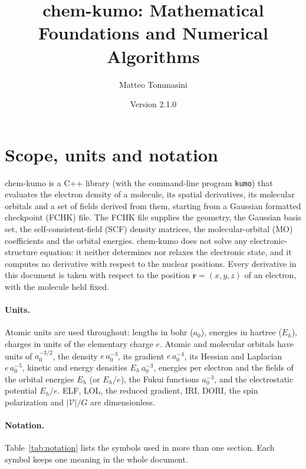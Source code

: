\documentclass[11pt,a4paper]{article}
\title{chem-kumo: Mathematical Foundations and Numerical Algorithms}
\author{Matteo Tommasini}
\date{Version 2.1.0}
\begin{document}
\maketitle
\tableofcontents

\section{Scope, units and notation}

chem-kumo is a C++ library (with the command-line program \texttt{kumo})
that evaluates the electron density of a molecule, its spatial derivatives,
its molecular orbitals and a set of fields derived from them, starting from
a Gaussian formatted checkpoint (FCHK) file. The FCHK file supplies the
geometry, the Gaussian basis set, the self-consistent-field (SCF) density
matrices, the molecular-orbital (MO) coefficients and the orbital energies.
chem-kumo does not solve any electronic-structure equation: it neither
determines nor relaxes the electronic state, and it computes no derivative
with respect to the nuclear positions. Every derivative in this document is
taken with respect to the position $\mathbf r=(x,y,z)$ of an electron, with
the molecule held fixed.

\paragraph{Units.} Atomic units are used throughout: lengths in bohr
($a_0$), energies in hartree ($E_h$), charges in units of the elementary
charge $e$. Atomic and molecular orbitals have units of $a_0^{-3/2}$, the
density $e\,a_0^{-3}$, its gradient $e\,a_0^{-4}$, its Hessian and
Laplacian $e\,a_0^{-5}$, kinetic and energy densities $E_h\,a_0^{-3}$,
energies per electron and the fields of the orbital energies $E_h$ (or
$E_h/e$), the Fukui functions $a_0^{-3}$, and the electrostatic potential
$E_h/e$. ELF, LOL, the reduced gradient, IRI, DORI, the spin polarization
and $|\mathcal V|/G$ are dimensionless.

\paragraph{Notation.} Table~\ref{tab:notation} lists the symbols used in
more than one section. Each symbol keeps one meaning in the whole document.
\end{document}
